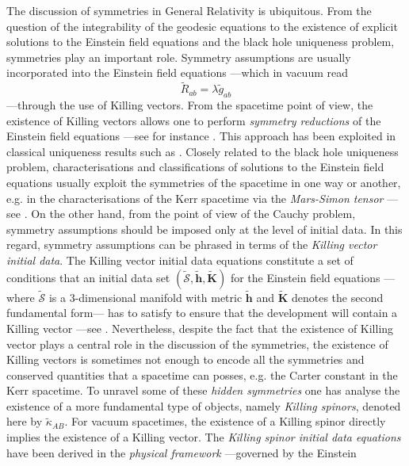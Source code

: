 \documentclass[10pt,a4paper]{article}
\theoremstyle{plain}
\def\bmh{{\bm h}}
\def\bmK{{\bm K}}
\begin{document}
   
The discussion of symmetries  in General
Relativity is ubiquitous. From the question of the integrability of the geodesic
equations to the existence of explicit solutions to the Einstein field
equations and the black hole uniqueness problem, symmetries play an important role.   
Symmetry assumptions are usually incorporated into
 the Einstein field equations ---which in vacuum read
\begin{equation}
\tilde{R}_{ab}=\lambda \tilde{g}_{ab}
\label{EFEVacuum}
\end{equation} 
---through the use of Killing vectors.  From the spacetime point of
view, the existence of Killing vectors allows one to perform
\emph{symmetry reductions} of the Einstein field equations ---see for
instance \cite{Wei90a}. This approach has been exploited in classical
uniqueness results such as \cite{Rob75b}.  Closely related to the
black hole uniqueness problem, characterisations and classifications
of solutions to the Einstein field equations usually exploit the
symmetries of the spacetime in one way or another, e.g. in the
characterisations of the Kerr spacetime via the \emph{Mars-Simon
tensor} ---see \cite{Mar99,Mar00,Sim84}.  On the other hand, from the
point of view of the Cauchy problem, symmetry assumptions should be
imposed only at the level of initial data. In this regard, symmetry
assumptions can be phrased in terms of the \emph{Killing vector
initial data}.  The Killing vector initial data equations constitute a
set of conditions that an initial data set
$(\tilde{\mathcal{S}},\tilde{\bmh},\tilde{\bmK})$ for the Einstein
field equations ---where $\tilde{\mathcal{S}}$ is a 3-dimensional
manifold with metric $\tilde{\bmh}$ and $\tilde{\bmK}$ denotes the
second fundamental form--- has to satisfy to ensure that the
development will contain a Killing vector ---see \cite{BeiChr97b}.
Nevertheless, despite the fact that the existence of Killing vector
plays a central role in the discussion of the symmetries, the
existence of Killing vectors is sometimes not enough to encode all the
symmetries and conserved quantities that a spacetime can posses,
e.g. the Carter constant in the Kerr spacetime. To unravel some of
these \emph{hidden symmetries} one has analyse the existence of a more
fundamental type of objects, namely \emph{Killing spinors}, denoted
here by $\tilde{\kappa}_{AB}$. For vacuum spacetimes, the existence of
a Killing spinor directly implies the existence of a Killing
vector. The \emph{Killing spinor initial data equations} have been
derived in the \emph{physical framework} ---governed by the Einstein
\end{document}
